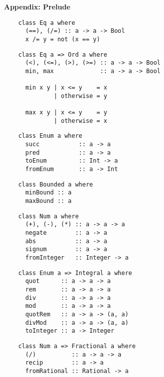 


\begin{multicols}{2}\scriptsize 
	
	\textbf{\normalsize Appendix: Prelude}
	
	\begin{verbatim}
	class Eq a where
	  (==), (/=) :: a -> a -> Bool
	  x /= y = not (x == y)
	\end{verbatim}
	
	\begin{verbatim}
	class Eq a => Ord a where
	  (<), (<=), (>), (>=) :: a -> a -> Bool
	  min, max             :: a -> a -> Bool
	
	  min x y | x <= y    = x
	          | otherwise = y
	
	  max x y | x <= y    = y
	          | otherwise = x
	\end{verbatim}
	
	\begin{verbatim}
	class Enum a where
	  succ           :: a -> a 
	  pred           :: a -> a
	  toEnum         :: Int -> a
	  fromEnum       :: a -> Int 
	\end{verbatim}
	
	\begin{verbatim}
	class Bounded a where
	  minBound :: a 
	  maxBound :: a
	\end{verbatim}
	
	\begin{verbatim}
	class Num a where 
	  (+), (-), (*) :: a -> a -> a
	  negate        :: a -> a
	  abs           :: a -> a
	  signum        :: a -> a
	  fromInteger   :: Integer -> a
	\end{verbatim}
	
	\begin{verbatim}
	class Enum a => Integral a where 
	  quot      :: a -> a -> a
	  rem       :: a -> a -> a
	  div       :: a -> a -> a
	  mod       :: a -> a -> a
	  quotRem   :: a -> a -> (a, a)
	  divMod    :: a -> a -> (a, a)
	  toInteger :: a -> Integer
	\end{verbatim}
	
	\begin{verbatim}
	class Num a => Fractional a where
	  (/)          :: a -> a -> a
	  recip        :: a -> a
	  fromRational :: Rational -> a
	\end{verbatim}
	

\end{multicols}
